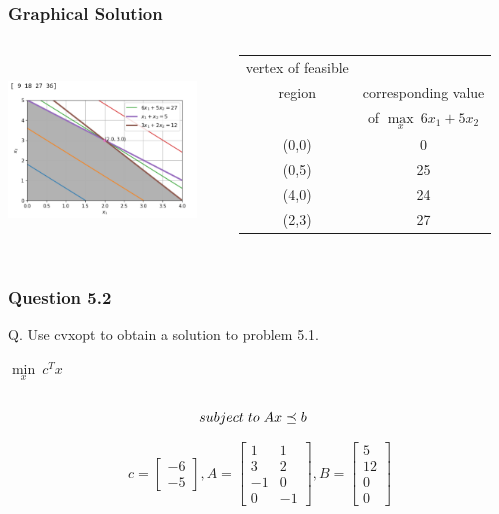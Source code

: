 \documentclass{beamer}
\begin{document}
\begin{frame}
 \frametitle{Graphical Solution}
\begin{columns}
  \begin{column}{0.47\textwidth}
   \includegraphics[width=5cm,height=5cm,angle=0]{g} 
  \end{column}
  \begin{column}{0.63\textwidth}
    \begin{table}[!ht]
   \centering
   \begin{tabular}{|c||c|} \hline
    \hline
     vertex of feasible \\ region & corresponding value \\& of  $\max\limits_{x}\ 6x_{1} + 5x_{2}$    \\ \hline
     (0,0) & 0 \\
     (0,5) & 25 \\
     (4,0) & 24 \\
     (2,3) & 27 \\ \hline
     \end{tabular}
    \end{table} 
  \end{column}
\end{columns}
  

\end{frame}

\begin{frame}
\frametitle{Question 5.2}
Q. Use cvxopt to obtain a solution to problem 5.1.  
 \begin{center}

 $\min\limits_{x}\ c^Tx$
\begin{alignat*}{2}
  \\subject\hspace{0.1cm} to\hspace{0.1cm}  Ax &\preceq b
\end{alignat*}

\end{center}
\[
c = 
\begin{bmatrix}
-6 
\\-5
\end{bmatrix}
,A = 
\begin{bmatrix}
1  &1 
\\3  &2
\\-1  &0
\\0  &-1
\end{bmatrix}
,B = 
\begin{bmatrix}
5
\\12 
\\0 
\\0  
\end{bmatrix}
\]
\end{frame}
\end{document}
